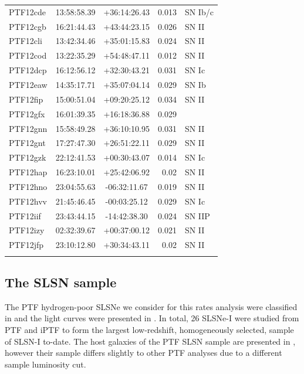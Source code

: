 \documentclass[a4paper,fleqn,usenatbib]{mnras}
\begin{document}
\begin{table}
\begin{center}
\begin{tabular}{lccrl}
    PTF12cde & 13:58:58.39 & +36:14:26.43 & 0.013 & SN Ib/c \\
    PTF12cgb & 16:21:44.43 & +43:44:23.15 & 0.026 & SN II \\
    PTF12cli & 13:42:34.46 & +35:01:15.83 & 0.024 & SN II \\
    PTF12cod & 13:22:35.29 & +54:48:47.11 & 0.012 & SN II \\
    PTF12dcp & 16:12:56.12 & +32:30:43.21 & 0.031 & SN Ic \\
    PTF12eaw & 14:35:17.71 & +35:07:04.14 & 0.029 & SN Ib \\
    PTF12fip & 15:00:51.04 & +09:20:25.12 & 0.034 & SN II \\
    PTF12gfx & 16:01:39.35 & +16:18:36.88 & 0.029 &  \\
    PTF12gnn & 15:58:49.28 & +36:10:10.95 & 0.031 & SN II \\
    PTF12gnt & 17:27:47.30 & +26:51:22.11 & 0.029 & SN II \\
    PTF12gzk & 22:12:41.53 & +00:30:43.07 & 0.014 & SN Ic \\
    PTF12hap & 16:23:10.01 & +25:42:06.92 & 0.02 & SN II \\
    PTF12hno & 23:04:55.63 & -06:32:11.67 & 0.019 & SN II \\
    PTF12hvv & 21:45:46.45 & -00:03:25.12 & 0.029 & SN Ic \\
    PTF12iif & 23:43:44.15 & -14:42:38.30 & 0.024 & SN IIP \\
    PTF12izy & 02:32:39.67 & +00:37:00.12 & 0.021 & SN II \\
    PTF12jfp & 23:10:12.80 & +30:34:43.11 & 0.02 & SN II \\
    \hline
		\label{tab:ccsn_properties}
    \end{tabular}
    \end{center}
    \end{table}


\subsection{The SLSN sample}
\label{SLSN_sample}

The PTF hydrogen-poor SLSNe we consider for this rates analysis were classified in \citet{Quimby2013} and the light curves were presented in \citet{DeCia2017}. In total, 26 SLSNe-I were studied from PTF and iPTF to form the largest low-redshift, homogeneously selected, sample of SLSN-I to-date. The host galaxies of the PTF SLSN sample are presented in \citet{Perley2016}, however their sample differs slightly to other PTF analyses due to a different sample luminosity cut.
\end{document}

